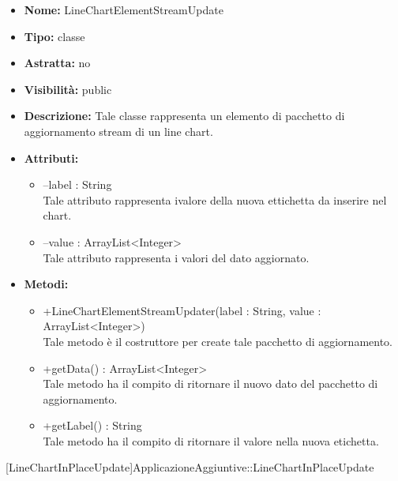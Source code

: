 			
			\begin{itemize}
			\item \textbf{Nome:} LineChartElementStreamUpdate
			\item \textbf{Tipo:} classe
			
		\item \textbf{Astratta:}
		no
			\item \textbf{Visibilità:} public
			\item \textbf{Descrizione:} Tale classe rappresenta un elemento di pacchetto di aggiornamento stream di un line chart.
			\item \textbf{Attributi:}
				\begin{itemize}
				\setlength{\itemsep}{5pt}
				
					\item[\ding{111}] {--label : String} \\ [1mm] Tale attributo rappresenta ivalore della nuova ettichetta da inserire nel chart.
					\item[\ding{111}] {--value : ArrayList<Integer>} \\ [1mm] Tale attributo rappresenta i valori del dato aggiornato.
				\end{itemize}
		
			\item \textbf{Metodi:}
				\begin{itemize}
				\setlength{\itemsep}{5pt}
				
					\item[\ding{111}] {{+LineChartElementStreamUpdater(label : String, value : ArrayList<Integer>)}} \\ [1mm] Tale metodo è il costruttore per create tale pacchetto di aggiornamento.
					\item[\ding{111}] {{+getData() : ArrayList<Integer>}} \\ [1mm] Tale metodo ha il compito di ritornare il nuovo dato del pacchetto di aggiornamento.
					\item[\ding{111}] {{+getLabel() : String}} \\ [1mm] Tale metodo ha il compito di ritornare il valore nella nuova etichetta.
				\end{itemize}
		
			\end{itemize}
	
			[LineChartInPlaceUpdate]{ApplicazioneAggiuntive::LineChartInPlaceUpdate}
			

	
